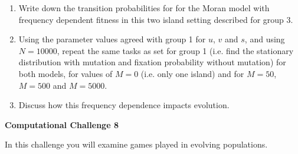 \documentclass[12pt]{article}
\begin{document}
\begin{enumerate}
\begin{enumerate}
\item Write down the transition probabilities for for the Moran model with frequency dependent fitness in this two island setting described for group 3.
\item Using the parameter values agreed with group 1 for $u$, $v$ and $s$, and using $N=10000$, repeat the same tasks as set for group 1 (i.e. find the stationary distribution with mutation and fixation probability without mutation) for both models, for values of $M=0$ (i.e. only one island) and for $M=50$, $M=500$ and $M=5000$. 
\item Discuss how this frequency dependence impacts evolution.
\end{enumerate}

\end{enumerate}



\begin{center}
{\Large \bf Computational Challenge 8
\\ \vskip5mm  }
\end{center}

In this challenge you will examine games played in evolving populations.
\end{document}
